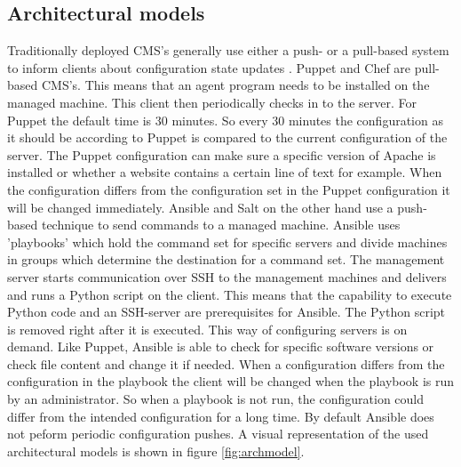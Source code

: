 \subsection{Architectural models}\label{subsec:archmod}
Traditionally deployed CMS's generally use either a push- or a pull-based system to inform clients about configuration state updates \cite{papazoglou2003service}. Puppet and Chef are pull-based CMS's. This means that an agent program needs to be installed on the managed machine. This client then periodically checks in to the server. For Puppet the default time is 30 minutes. So every 30 minutes the configuration as it should be according to Puppet is compared to the current configuration of the server. The Puppet configuration can make sure a specific version of Apache is installed or whether a website contains a certain line of text for example. When the configuration differs from the configuration set in the Puppet configuration it will be changed immediately. Ansible and Salt on the other hand use a push-based technique to send commands to a managed machine. Ansible uses 'playbooks' which hold the command set for specific servers and divide machines in groups which determine the destination for a command set. The management server starts communication over SSH to the management machines and delivers and runs a Python script on the client. This means that the capability to execute Python code and an SSH-server are prerequisites for Ansible. The Python script is removed right after it is executed. This way of configuring servers is on demand. Like Puppet, Ansible is able to check for specific software versions or check file content and change it if needed. When a configuration differs from the configuration in the playbook the client will be changed when the playbook is run by an administrator. So when a playbook is not run, the configuration could differ from the intended configuration for a long time. By default Ansible does not peform periodic configuration pushes. A visual representation of the used architectural models is shown in figure \ref{fig:archmodel}. 

